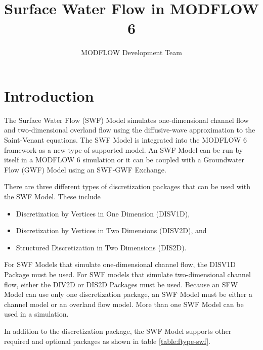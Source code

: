 \documentclass[fleqn]{article}
\author{MODFLOW Development Team}
\begin{document}
\title{Surface Water Flow in MODFLOW 6}
\maketitle

\tableofcontents

\section{Introduction}
The Surface Water Flow (SWF) Model simulates one-dimensional channel flow and two-dimensional overland flow using the diffusive-wave approximation to the Saint-Venant equations.  The SWF Model is integrated into the MODFLOW 6 framework as a new type of supported model.  An SWF Model can be run by itself in a MODFLOW 6 simulation or it can be coupled with a Groundwater Flow (GWF) Model using an SWF-GWF Exchange.

There are three different types of discretization packages that can be used with the SWF Model.  These include 

\begin{itemize}
  \item Discretization by Vertices in One Dimension (DISV1D), 
  \item Discretization by Vertices in Two Dimensions (DISV2D), and
  \item Structured Discretization in Two Dimensions (DIS2D).
\end{itemize}

\noindent For SWF Models that simulate one-dimensional channel flow, the DISV1D Package must be used.  For SWF models that simulate two-dimensional channel flow, either the DIV2D or DIS2D Packages must be used.  Because an SFW Model can use only one discretization package, an SWF Model must be either a channel model or an overland flow model.  More than one SWF Model can be used in a simulation.

In addition to the discretization package, the SWF Model supports other required and optional packages as shown in table \ref{table:ftype-swf}.
\end{document}
